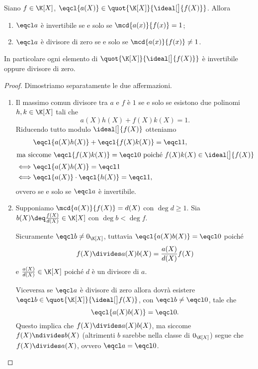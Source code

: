 \begin{proposition}
    \label{prop:invertibili_divzero_in_KX/f}
    Siano $f \in \K[X]$, $\eqcl{a(X)} \in \quot{\K[X]}{\ideal[\big]{f(X)}}$.
    Allora \begin{enumerate}[label={(\roman*)}]
        \item $\eqcl a$ è invertibile se e solo se $\mcd{a(x)}{f(x)} = 1$;
        \item $\eqcl a$ è divisore di zero se e solo se $\mcd{a(x)}{f(x)} \neq 1$.
    \end{enumerate}
    In particolare ogni elemento di $\quot{\K[X]}{\ideal[\big]{f(X)}}$ è invertibile oppure divisore di zero.
\end{proposition}
\begin{proof}
    Dimostriamo separatamente le due affermazioni.
    \begin{enumerate}[label={(\roman*)}]
        \item Il massimo comun divisore tra $a$ e $f$ è $1$ se e solo se esistono due polinomi $h, k \in \K[X]$ tali che\[
            a(X)h(X) + f(X)k(X) = 1.    
        \] Riducendo tutto modulo $\ideal[\big]{f(X)}$ otteniamo \begin{align*}
            &\eqcl{a(X)h(X)} + \eqcl{f(X)k(X)} = \eqcl 1,\\
            \intertext{ma siccome $\eqcl{f(X)k(X)} = \eqcl 0$ poiché $f(X)k(X) \in \ideal[\big]{f(X)}$}
            \iff &\eqcl{a(X)h(X)} = \eqcl 1 \\
            \iff &\eqcl{a(X)}\cdot\eqcl{h(X)} = \eqcl 1,
        \end{align*} ovvero se e solo se $\eqcl a$ è invertibile.
        \item Supponiamo $\mcd{a(X)}{f(X)} = d(X)$ con $\deg d \geq 1$. Sia $b(X) \deq \frac{f(X)}{d(X)} \in \K[X]$ con $\deg b < \deg f$.
        
        Sicuramente $\eqcl b \neq 0_{\K[X]}$, tuttavia $\eqcl{a(X)b(X)} = \eqcl 0$ poiché \[
            f(X) \divides a(X)b(X) = \frac{a(X)}{d(X)}f(X)    
        \] e $\frac{a(X)}{d(X)} \in \K[X]$ poiché $d$ è un divisore di $a$.

        Viceversa se $\eqcl a$ è divisore di zero allora dovrà esistere $\eqcl b \in \quot{\K[X]}{\ideal[\big]f(X)}$, con $\eqcl b \neq \eqcl 0$, tale che \[
            \eqcl{a(X)b(X)} = \eqcl 0.    
        \] Questo implica che $f(X) \divides a(X)b(X)$, ma siccome $f(X) \ndivides b(X)$ (altrimenti $b$ sarebbe nella classe di $0_{\K[X]}$) segue che $f(X) \divides a(X)$, ovvero $\eqcl a = \eqcl 0$.
    \end{enumerate}
\end{proof}

